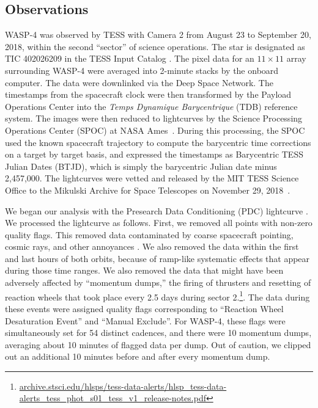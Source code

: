 \documentclass[12pt,twocolumn,tighten]{aastex62}
\begin{document}
\subsection{Observations}

WASP-4 was observed by TESS with Camera 2 from August 23 to September
20, 2018, within the second ``sector'' of science operations.  The
star is designated as TIC 402026209 in the TESS Input Catalog
\citep{stassun_TIC_2018}.  The pixel data for an $11\times11$ array
surrounding WASP-4 were averaged into 2-minute stacks by the onboard
computer.  The data were downlinked via the Deep Space Network. The
timestamps from the spacecraft clock were then transformed by the
Payload Operations Center into the {\it Temps Dynamique Barycentrique}
(TDB) reference system.  The images were then reduced to lightcurves
by the Science Processing Operations Center (SPOC) at NASA
Ames~\citep{jenkins_tess_2016}.  During this processing, the SPOC used
the known spacecraft trajectory to compute the barycentric time
corrections on a target by target basis, and expressed the timestamps
as Barycentric TESS Julian Dates (BTJD), which is simply the
barycentric Julian date minus 2{,}457{,}000.  The lightcurves were
vetted and released by the MIT TESS Science Office to the Mikulski
Archive for Space Telescopes on November 29,
2018~\citep{ricker_tess_alerts_2018}.

We began our analysis with the Presearch Data Conditioning (PDC)
lightcurve \citep{smith_kepler_apertures_2017,smith_kepler_PDC_2017}.
We processed the lightcurve as follows.  First, we removed all points
with non-zero quality flags.  This removed data contaminated by coarse
spacecraft pointing, cosmic rays, and other annoyances
\citep{tess_data_product_description_2018}.  We also removed the data
within the first and last hours of both orbits, because of ramp-like
systematic effects that appear during those time ranges. We also
removed the data that might have been adversely affected by ``momentum
dumps,'' the firing of thrusters and resetting of reaction wheels that
took place every 2.5 days during sector
2.\footnote{\url{archive.stsci.edu/hlsps/tess-data-alerts/hlsp_tess-data-alerts_tess_phot_s01_tess_v1_release-notes.pdf}}.
The data during these events were assigned quality flags corresponding
to ``Reaction Wheel Desaturation Event'' and ``Manual Exclude''.  For
WASP-4, these flags were simultaneously set for 54 distinct cadences,
and there were 10 momentum dumps, averaging about 10 minutes of
flagged data per dump.  Out of caution, we clipped out an additional
10 minutes before and after every momentum dump.
\end{document}
